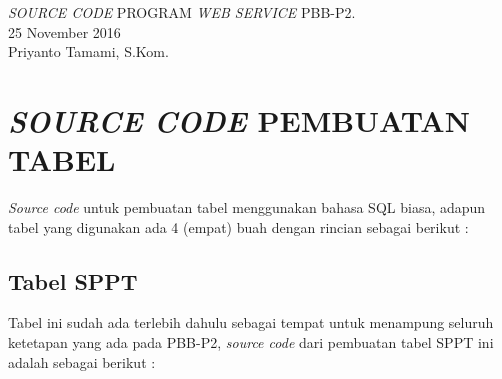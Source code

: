 \documentclass[pdftex,12pt, oneside]{article}
\begin{document}
\sloppy %

\begin{center}
{\large \textit{SOURCE CODE} PROGRAM \textit{WEB SERVICE} PBB-P2.}
\\[1cm]
25 November 2016\\
Priyanto Tamami, S.Kom.
\end{center}




\section{\textit{SOURCE CODE} PEMBUATAN TABEL}

\textit{Source code} untuk pembuatan tabel menggunakan bahasa SQL biasa, adapun tabel yang digunakan ada 4 (empat) buah dengan rincian sebagai berikut :


  \subsection{Tabel SPPT}
  
  Tabel ini sudah ada terlebih dahulu sebagai tempat untuk menampung seluruh ketetapan yang ada pada PBB-P2, \textit{source code} dari pembuatan tabel SPPT ini adalah sebagai berikut :
  
\end{document}
